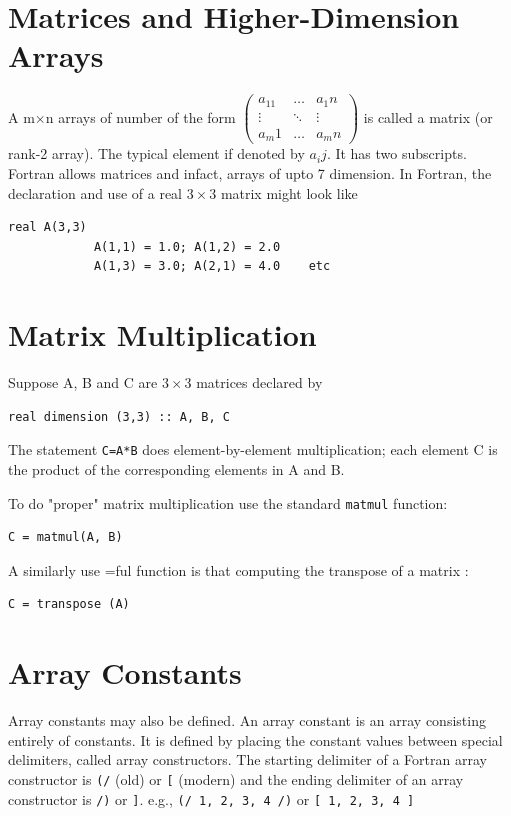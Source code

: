 \documentclass[12pt,oneside]{book}
\newcommand{\code}[1]{\lstinline[keywordstyle=\color{black},basicstyle=\ttfamily]{#1}}
\begin{document}
    \section{Matrices and Higher-Dimension Arrays}
    A m$ \times $n arrays of number of the form $ \begin{pmatrix}
            a_11 &\dots & a_1n\\
            \vdots & \ddots & \vdots\\
            a_m1 & \dots & a_mn
        \end{pmatrix} $ is called a matrix (or rank-2 array). The typical element if denoted by $ a_ij $. It has two subscripts. Fortran allows matrices and infact, arrays of upto 7 dimension. In Fortran, the declaration and use of a real $ 3\times 3 $ matrix might look like\begin{lstlisting}[numbers=none]
            real A(3,3)
            A(1,1) = 1.0; A(1,2) = 2.0
            A(1,3) = 3.0; A(2,1) = 4.0    etc
        \end{lstlisting}
    \section{Matrix Multiplication} Suppose A, B and C are $ 3\times3 $ matrices declared by\begin{lstlisting}[numbers=none]
        real dimension (3,3) :: A, B, C
    \end{lstlisting} 
    The statement \code{C=A*B} does element-by-element multiplication; each element C is the product of the corresponding elements in A and B.

    To do "proper" matrix multiplication use the standard \code{matmul} function: \begin{lstlisting}[numbers=none]
        C = matmul(A, B)
    \end{lstlisting}
    A similarly use =ful function is that computing the transpose of a matrix :
    \begin{lstlisting}[numbers=none]
        C = transpose (A)
    \end{lstlisting}
    \section{Array Constants} Array constants may also be defined. An array constant is an array consisting entirely of constants. It is defined by placing the constant values between special delimiters, called array constructors. The starting delimiter of a Fortran array constructor is \code{(/} (old) or \code{[} (modern) and the ending delimiter of an array constructor is \code{/)} or \code{]}. e.g., \code{(/ 1, 2, 3, 4 /)} or \code{[ 1, 2, 3, 4 ]}
\end{document}
